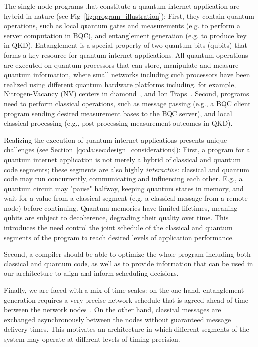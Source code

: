 The single-node programs that constitute a quantum internet application are hybrid in nature (see Fig~\ref{fig:program_illustration}):
First, they contain quantum operations, such as local quantum gates and measurements (e.g. to perform a server computation in BQC), and entanglement generation (e.g. to produce key in QKD). Entanglement is a special property of two quantum bits (qubits) that forms a key resource for quantum internet applications. 
All quantum operations are executed on quantum processors that can store, manipulate and measure quantum information, where small networks including such processors have been realized using different quantum hardware platforms including, for example,  Nitrogen-Vacancy (NV) centers in diamond~\cite{pompili2021realization}, and Ion Traps~\cite{krutyanskiy2023entanglement}.
Second, programs need to perform classical operations, such as message passing (e.g., a BQC client program sending desired measurement bases to the BQC server), and local classical processing (e.g., post-processing measurement outcomes in QKD).

Realizing the execution of quantum internet applications presents unique challenges (see Section~\ref{qoala:sec:design_considerations}): 
First, a program for a quantum internet application is not merely a hybrid of classical and quantum code segments; these segments are also highly \textit{interactive}: classical and quantum code may run concurrently, communicating and influencing each other.
E.g., a quantum circuit may "pause" halfway, keeping quantum states in memory, and wait for a value from a classical segment (e.g. a classical message from a remote node) before continuing.
Quantum memories have limited lifetimes, meaning qubits are subject to decoherence, degrading their quality over time. This introduces the need 
control the joint schedule of the classical and quantum segments of the program to reach desired levels of application performance.

Second, a compiler should be able to optimize the whole program including both classical and quantum code, as well as to provide information that can be used in our architecture to align and inform scheduling decisions. 

Finally, we are faced with a mix of time scales:
on the one hand, entanglement generation requires a very precise network schedule that is agreed ahead of time between the network nodes~\cite{dahlberg2019link}. On the other hand, classical messages are exchanged asynchronously between the nodes without guaranteed message delivery times. This motivates an architecture in which different segments of the system may operate at different levels of timing precision. 

